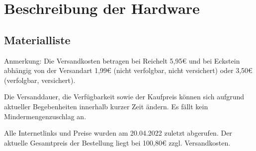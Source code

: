 
\section{Beschreibung der Hardware}
\subsection{Materialliste}
Anmerkung: Die Versandkosten betragen bei Reichelt 5,95€ und bei Eckstein abhängig von der Versandart 1,99€ (nicht verfolgbar, nicht versichert) oder 3,50€ (verfolgbar, versichert).\par Die Versanddauer, die Verfügbarkeit sowie der Kaufpreis können sich aufgrund aktueller Begebenheiten innerhalb kurzer Zeit ändern. Es fällt kein Mindermengenzuschlag an.\par 
Alle Internetlinks und Preise wurden am 20.04.2022 zuletzt abgerufen. Der aktuelle Gesamtpreis der Bestellung liegt bei 100,80€ zzgl. Versandkosten.

\vspace{1cm}

